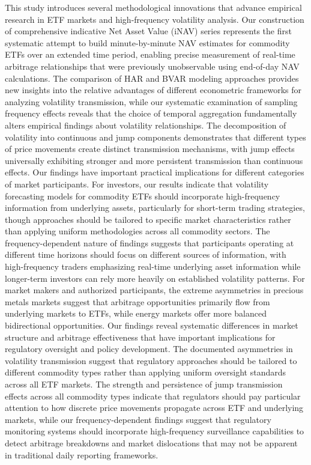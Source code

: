 This study introduces several methodological innovations that advance empirical research in ETF markets and high-frequency volatility analysis. Our construction of comprehensive indicative Net Asset Value (iNAV) series represents the first systematic attempt to build minute-by-minute NAV estimates for commodity ETFs over an extended time period, enabling precise measurement of real-time arbitrage relationships that were previously unobservable using end-of-day NAV calculations. The comparison of HAR and BVAR modeling approaches provides new insights into the relative advantages of different econometric frameworks for analyzing volatility transmission, while our systematic examination of sampling frequency effects reveals that the choice of temporal aggregation fundamentally alters empirical findings about volatility relationships. The decomposition of volatility into continuous and jump components demonstrates that different types of price movements create distinct transmission mechanisms, with jump effects universally exhibiting stronger and more persistent transmission than continuous effects.
Our findings have important practical implications for different categories of market participants. For investors, our results indicate that volatility forecasting models for commodity ETFs should incorporate high-frequency information from underlying assets, particularly for short-term trading strategies, though approaches should be tailored to specific market characteristics rather than applying uniform methodologies across all commodity sectors. The frequency-dependent nature of findings suggests that participants operating at different time horizons should focus on different sources of information, with high-frequency traders emphasizing real-time underlying asset information while longer-term investors can rely more heavily on established volatility patterns. For market makers and authorized participants, the extreme asymmetries in precious metals markets suggest that arbitrage opportunities primarily flow from underlying markets to ETFs, while energy markets offer more balanced bidirectional opportunities.
Our findings reveal systematic differences in market structure and arbitrage effectiveness that have important implications for regulatory oversight and policy development. The documented asymmetries in volatility transmission suggest that regulatory approaches should be tailored to different commodity types rather than applying uniform oversight standards across all ETF markets. The strength and persistence of jump transmission effects across all commodity types indicate that regulators should pay particular attention to how discrete price movements propagate across ETF and underlying markets, while our frequency-dependent findings suggest that regulatory monitoring systems should incorporate high-frequency surveillance capabilities to detect arbitrage breakdowns and market dislocations that may not be apparent in traditional daily reporting frameworks.
